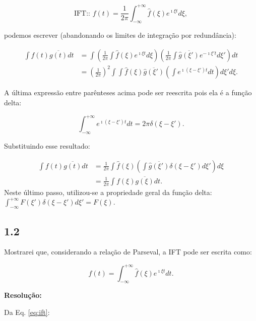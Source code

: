 \begin{equation}
\text{IFT::  } f(t) = \frac{1}{2 \pi} \int_{-\infty}^{+\infty} \hat{f}(\xi) e^{\imath \xi t}d \xi,
\label{eq:ift}
\end{equation}

podemos escrever (abandonando os limites de integração por redundância):

\begin{align*} 
\int f(t)\overline{g(t)} dt  &=  \int \left( \frac{1}{2 \pi} \int \hat{f}(\xi) e^{\imath \xi t}d \xi \right) \left( \frac{1}{2 \pi} \int \overline{\hat{g}(\xi')} e^{-\imath \xi' t}d \xi' \right) d t \\[10pt]
 &=  \left(\frac{1}{2 \pi}\right)^{2} \int \int \hat{f}(\xi) \overline{\hat{g}(\xi')} \left( \int e^{\imath(\xi - \xi')t} dt\right) d \xi' d\xi.
\end{align*}

A última expressão entre parênteses acima pode ser reescrita pois ela é a função delta:

\begin{equation*}
\int_{-\infty}^{+\infty} e^{\imath(\xi - \xi')t} dt = 2 \pi \delta(\xi - \xi ').
\end{equation*}

Substituindo esse resultado:

\begin{align*} 
\int f(t)\overline{g(t)} dt  &= \frac{1}{2 \pi} \int \hat{f}(\xi) \left( \int \overline{\hat{g}(\xi ')} \delta(\xi - \xi ') d \xi ' \right) d \xi \\[10pt]
 &= \frac{1}{2 \pi}  \int f(\xi )\overline{g(\xi)} dt. \tag*{(Q.E.D.) }
\end{align*} 
Neste último passo, utilizou-se a propriedade geral da função delta: $\int_{-\infty}^{+\infty }F(\xi') \delta(\xi - \xi') d \xi' = F(\xi)$.

\subsection*{1.2}
%

Mostrarei que, considerando a relação de Parseval, a IFT pode ser escrita como:

\begin{equation*}
f(t) = \int_{-\infty}^{+\infty} \hat{f}(\xi)e^{\imath \xi t} d t.
\end{equation*}

\textbf{Resolução:}

Da Eq. \ref{eq:ift}:

